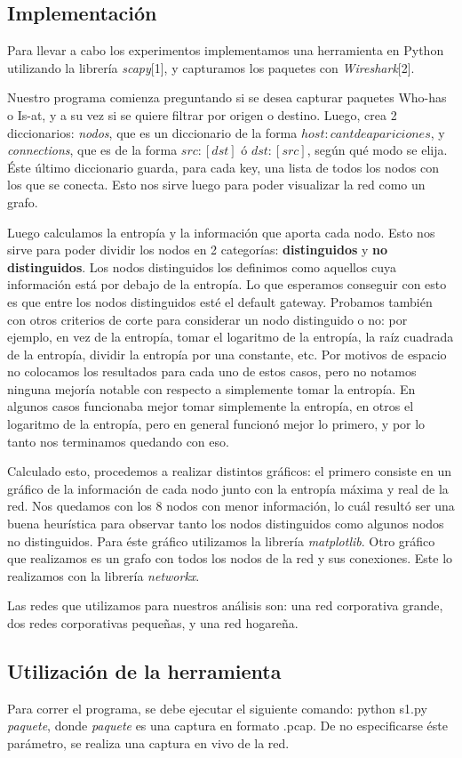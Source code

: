 \subsection{Implementación}
Para llevar a cabo los experimentos implementamos una herramienta en Python utilizando la librería \textit{scapy}[1], y capturamos los paquetes con \textit{Wireshark}[2].

Nuestro programa comienza preguntando si se desea capturar paquetes Who-has o Is-at, y a su vez si se quiere filtrar por origen o destino. Luego, crea 2 diccionarios: \textit{nodos}, que es un diccionario de la forma ${host: cant de apariciones}$, y \textit{connections}, que es de la forma ${src: [dst] }$ ó ${dst: [src] }$, según qué modo se elija. Éste último diccionario guarda, para cada key, una lista de todos los nodos con los que se conecta. Esto nos sirve luego para poder visualizar la red como un grafo.

Luego calculamos la entropía y la información que aporta cada nodo. Esto nos sirve para poder dividir los nodos en 2 categorías: \textbf{distinguidos} y \textbf{no distinguidos}. Los nodos distinguidos los definimos como aquellos cuya información está por debajo de la entropía. Lo que esperamos conseguir con esto es que entre los nodos distinguidos esté el default gateway. Probamos también con otros criterios de corte para considerar un nodo distinguido o no: por ejemplo, en vez de la entropía, tomar el logaritmo de la entropía, la raíz cuadrada de la entropía, dividir la entropía por una constante, etc. Por motivos de espacio no colocamos los resultados para cada uno de estos casos, pero no notamos ninguna mejoría notable con respecto a simplemente tomar la entropía. En algunos casos funcionaba mejor tomar simplemente la entropía, en otros el logaritmo de la entropía, pero en general funcionó mejor lo primero, y por lo tanto nos terminamos quedando con eso.

Calculado esto, procedemos a realizar distintos gráficos: el primero consiste en un gráfico de la información de cada nodo junto con la entropía máxima y real de la red. Nos quedamos con los 8 nodos con menor información, lo cuál resultó ser una buena heurística para observar tanto los nodos distinguidos como algunos nodos no distinguidos. Para éste gráfico utilizamos la librería \textit{matplotlib}. Otro gráfico que realizamos es un grafo con todos los nodos de la red y sus conexiones. Este lo realizamos con la librería \textit{networkx}.

Las redes que utilizamos para nuestros análisis son: una red corporativa grande, dos redes corporativas pequeñas, y una red hogareña.

\subsection{Utilización de la herramienta}
Para correr el programa, se debe ejecutar el siguiente comando: python s1.py \textit{paquete}, donde \textit{paquete} es una captura en formato .pcap. De no especificarse éste parámetro, se realiza una captura en vivo de la red.

